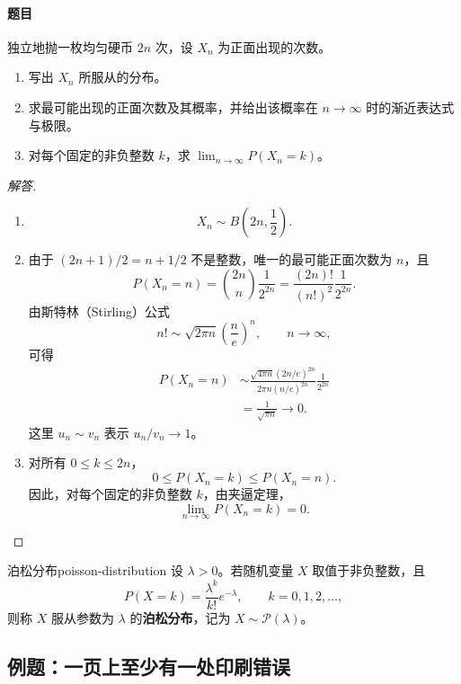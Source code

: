 \paragraph{题目}
独立地抛一枚均匀硬币 $2n$ 次，设 $X_n$ 为正面出现的次数。
\begin{enumerate}
\item 写出 $X_n$ 所服从的分布。
\item 求最可能出现的正面次数及其概率，并给出该概率在 $n\to\infty$ 时的渐近表达式与极限。
\item 对每个固定的非负整数 $k$，求 $\displaystyle\lim_{n\to\infty}P(X_n=k)$。
\end{enumerate}

\begin{proof}[解答]
\begin{enumerate}
\item \[
X_n\sim B\left(2n,\frac12\right).
\]
\item 由于 $(2n+1)/2=n+1/2$ 不是整数，唯一的最可能正面次数为 $n$，且
\[
P(X_n=n)=\binom{2n}{n}\frac1{2^{2n}}
=\frac{(2n)!}{(n!)^2}\frac1{2^{2n}}.
\]
由斯特林（Stirling）公式
\[
n!\sim\sqrt{2\pi n}\left(\frac ne\right)^n,
\qquad n\to\infty,
\]
可得
\[
\begin{aligned}
P(X_n=n)
&\sim
\frac{\sqrt{4\pi n}(2n/e)^{2n}}
{2\pi n(n/e)^{2n}}\frac1{2^{2n}}\\
&=\frac1{\sqrt{\pi n}}\longrightarrow0.
\end{aligned}
\]
这里 $u_n\sim v_n$ 表示 $u_n/v_n\to1$。
\item 对所有 $0\leq k\leq2n$，
\[
0\leq P(X_n=k)\leq P(X_n=n).
\]
因此，对每个固定的非负整数 $k$，由夹逼定理，
\[
\lim_{n\to\infty}P(X_n=k)=0.
\]
\end{enumerate}
\end{proof}

\begin{mydefinition}{泊松分布}{poisson-distribution}
设 $\lambda>0$。若随机变量 $X$ 取值于非负整数，且
\[
P(X=k)=\frac{\lambda^k}{k!}e^{-\lambda},
\qquad k=0,1,2,\ldots,
\]
则称 $X$ 服从参数为 $\lambda$ 的\textbf{泊松分布}，记为 $X\sim\mathcal P(\lambda)$。
\end{mydefinition}

\subsection{例题：一页上至少有一处印刷错误}\label{note:c2:e6}
